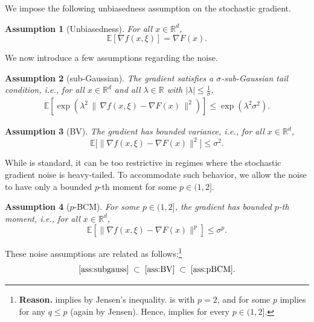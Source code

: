\documentclass[10pt]{article}
\newtheorem{assumption}[assumption]{Assumption}
\begin{document}
We impose the following unbiasedness assumption on the stochastic gradient.
\begin{assumption}[Unbiasedness]\label{ass:unbiased}
For all $x \in \mathbb{R}^d$,
\[
\mathbb{E}[\nabla f(x,\xi)] = \nabla F(x).
\]
\end{assumption}
We now introduce a few assumptions regarding the noise. 
\begin{assumption}[sub-Gaussian]\label{ass:subgauss}
The gradient satisfies a $\sigma$-sub-Gaussian tail condition, i.e., 
for all $x\in\mathbb{R}^d$ and
all $\lambda\in\mathbb{R}$ with $|\lambda|\le\frac{1}{\sigma}$,
\begin{align}\label{eq:subGaussGrad}
    \mathbb{E}\!\left[
        \exp\!\left(
            \lambda^2\,\|\,\nabla f(x, \xi) -\nabla F(x)\,\|^2
        \right)
    \right]
    \le
    \exp\!\left(
        \lambda^2\sigma^2
    \right).
\end{align}
\end{assumption}
\begin{assumption}[BV]\label{ass:BV}
The gradient has bounded variance, i.e., for all $x \in\mathbb{R}^d$,
\[
\mathbb{E}\bigl[\|\nabla f(x, \xi) - \nabla F(x)\|^2\bigr] \le \sigma^2.
\]
\end{assumption}
While  is standard, it can be too restrictive in regimes where the stochastic gradient noise is heavy-tailed.
To accommodate such behavior, we allow the noise to have only a bounded $p$-th moment for some $p\in(1,2]$.

\begin{assumption}[$p$-BCM]\label{ass:pBCM}
For some $p\in(1,2]$, the gradient has bounded $p$-th moment, i.e., for all $x\in\mathbb{R}^d$,
\[
\mathbb{E}[\|\nabla f(x, \xi) - \nabla F(x)\|^p] \le \sigma^p.
\]
\end{assumption}


These noise assumptions are related as follows:\footnote{
\textbf{Reason.}
 implies  by Jensen's inequality.
 is  with $p=2$, and  for some $p$ implies  for any $q\le p$ (again by Jensen).
Hence,  implies  for every $p\in(1,2]$.
}
\[
\text{\Cref{ass:subgauss}}
\;\subset\;
\text{\Cref{ass:BV}}
\;\subset\;
\text{\Cref{ass:pBCM}}.
\]
\end{document}
